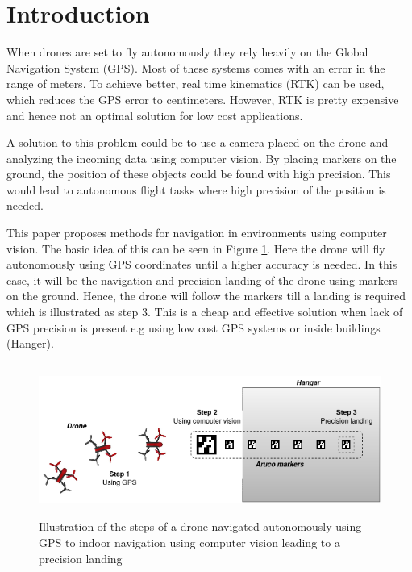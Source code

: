 \documentclass[../Head/Report.tex]{subfiles}
\begin{document}
\section{Introduction}

When drones are set to fly autonomously they rely heavily on the Global Navigation System (GPS). Most of these systems comes with an error in the range of meters. To achieve better, real time kinematics (RTK) can be used, which reduces the GPS error to centimeters. However, RTK is pretty expensive and hence not an optimal solution for low cost applications. 

A solution to this problem could be to use a camera placed on the drone and analyzing the incoming data using computer vision. By placing markers on the ground, the position of these objects could be found with high precision. This would lead to autonomous flight tasks where high precision of the position is needed.      

This paper proposes methods for navigation in environments using computer vision. The basic idea of this can be seen in Figure \ref{fig:masterProjectIllustration}. Here the drone will fly autonomously using GPS coordinates until a higher accuracy is needed. In this case, it will be the navigation and precision landing of the drone using markers on the ground. Hence, the drone will follow the markers till a landing is required which is illustrated as step 3. This is a cheap and effective solution when lack of GPS precision is present e.g using low cost GPS systems or inside buildings (Hanger).

\begin{figure}[H]
	\centering
	\includegraphics[height=5cm]{../Figures/masterProjectIllustration.png}
	\captionsetup{justification=centering}
    \caption{Illustration of the steps of a drone navigated autonomously using GPS to indoor navigation using computer vision leading to a precision landing }
    \label{fig:masterProjectIllustration}
\end{figure}
\end{document}
